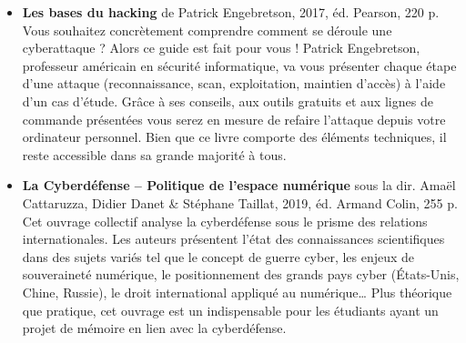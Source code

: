 \documentclass[a4paper]{article}
\begin{document}
\begin{itemize}
\item \textbf{Les bases du hacking} de Patrick Engebretson, 2017, éd. Pearson, 220 p.
\\
Vous souhaitez concrètement comprendre comment se déroule une cyberattaque ? Alors ce guide est fait pour vous ! Patrick Engebretson, professeur américain en sécurité informatique, va vous présenter chaque étape d’une attaque (reconnaissance, scan, exploitation, maintien d’accès) à l’aide d’un cas d’étude. Grâce à ses conseils, aux outils gratuits et aux lignes de commande présentées vous serez en mesure de refaire l’attaque depuis votre ordinateur personnel. Bien que ce livre comporte des éléments techniques, il reste accessible dans sa grande majorité à tous.


\item \textbf{La Cyberdéfense – Politique de l’espace numérique} sous la dir. Amaël Cattaruzza, Didier Danet \& Stéphane Taillat, 2019, éd. Armand Colin, 255 p.
\\
Cet ouvrage collectif analyse la cyberdéfense sous le prisme des relations internationales. Les auteurs présentent l’état des connaissances scientifiques dans des sujets variés tel que le concept de guerre cyber, les enjeux de souveraineté numérique, le positionnement des grands pays cyber (États-Unis, Chine, Russie), le droit international appliqué au numérique… Plus théorique que pratique, cet ouvrage est un indispensable pour les étudiants ayant un projet de mémoire en lien avec la cyberdéfense.

\end{itemize}
\end{document}
